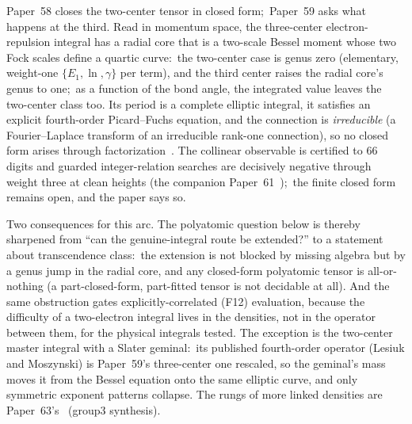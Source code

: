 \documentclass[aps,pra,twocolumn,superscriptaddress,longbibliography]{revtex4-2}
\newcommand{\gvc}[2]{#2}
\begin{document}
Paper~58 closes the two-center tensor in closed form;\ Paper~59 asks what
happens at the third.  Read in momentum space, the three-center
electron-repulsion integral has a radial core that is a two-scale Bessel moment whose two Fock
scales define a quartic curve:\ the two-center case is genus zero
(elementary, weight-one $\{E_1,\ln,\gamma\}$ per term), and the third center
raises the radial core's genus to one;\ as a function of the bond angle, the integrated
value leaves the two-center class too.  Its period is a complete elliptic integral, it
satisfies an explicit fourth-order Picard--Fuchs equation, and the
connection is \emph{irreducible} (a Fourier--Laplace transform of an
irreducible rank-one connection), so no closed form arises through
factorization~\cite{loutey_paper59}.  The collinear observable is
certified to $66$ digits and guarded integer-relation searches are
decisively negative through weight three at clean heights (the companion
Paper~61~\cite{loutey_paper61});\ the finite
closed form remains open, and the paper says so.

Two consequences for this arc.  The polyatomic question below is thereby
sharpened from ``can the genuine-integral route be extended?'' to a
statement about transcendence class:\ the extension is not blocked by
missing algebra but by a genus jump in the radial core, and any closed-form polyatomic
tensor is all-or-nothing (a part-closed-form, part-fitted tensor is not
decidable at all).  And the same obstruction gates explicitly-correlated
(F12) evaluation, \gvc{p59-operator-clause-scope}{because the difficulty of a two-electron integral lives
in the densities, not in the operator between them, for the physical integrals
tested}.  The exception is the two-center master integral with a Slater geminal:\
its published fourth-order operator (Lesiuk and Moszynski) is Paper~59's
three-center one rescaled, so the geminal's mass moves it from the Bessel
equation onto the same elliptic curve, and only symmetric exponent patterns
collapse.  The rungs of more linked densities are Paper~63's~\cite{loutey_paper63}
(group3 synthesis).
\end{document}
